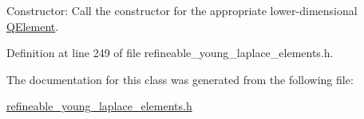 Constructor\+: Call the constructor for the appropriate lower-\/dimensional \hyperlink{classoomph_1_1QElement}{Q\+Element}. 



Definition at line 249 of file refineable\+\_\+young\+\_\+laplace\+\_\+elements.\+h.



The documentation for this class was generated from the following file\+:\begin{DoxyCompactItemize}
\item 
\hyperlink{refineable__young__laplace__elements_8h}{refineable\+\_\+young\+\_\+laplace\+\_\+elements.\+h}\end{DoxyCompactItemize}
